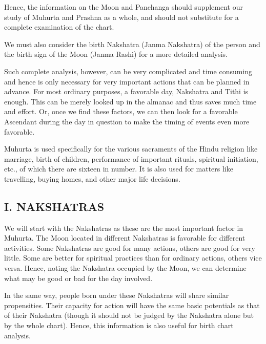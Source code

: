  

Hence, the information on the Moon and Panchanga should supplement our study of Muhurta and Prashna as a whole, and should not substitute for a complete examination of the chart.

 

We must also consider the birth Nakshatra (Janma Nakshatra) of the person and the birth sign of the Moon (Janma Rashi) for a more detailed analysis.

 

Such complete analysis, however, can be very complicated and time consuming and hence is only necessary for very important actions that can be planned in advance. For most ordinary purposes, a favorable day, Nakshatra and Tithi is enough. This can be merely looked up in the almanac and thus saves much time and effort. Or, once we find these factors, we can then look for a favorable Ascendant during the day in question to make the timing of events even more favorable.

 

Muhurta is used specifically for the various sacraments of the Hindu religion like marriage, birth of children, performance of important rituals, spiritual initiation, etc., of which there are sixteen in number. It is also used for matters like travelling, buying homes, and other major life decisions.

 

\subsection{I. NAKSHATRAS}


We will start with the Nakshatras as these are the most important factor in Muhurta. The Moon located in different Nakshatras is favorable for different activities. Some Nakshatras are good for many actions, others are good for very little. Some are better for spiritual practices than for ordinary actions, others vice versa. Hence, noting the Nakshatra occupied by the Moon, we can determine what may be good or bad for the day involved.

 

In the same way, people born under these Nakshatras will share similar propensities. Their capacity for action will have the same basic potentials as that of their Nakshatra (though it should not be judged by the Nakshatra alone but by the whole chart). Hence, this information is also useful for birth chart analysis.

 

